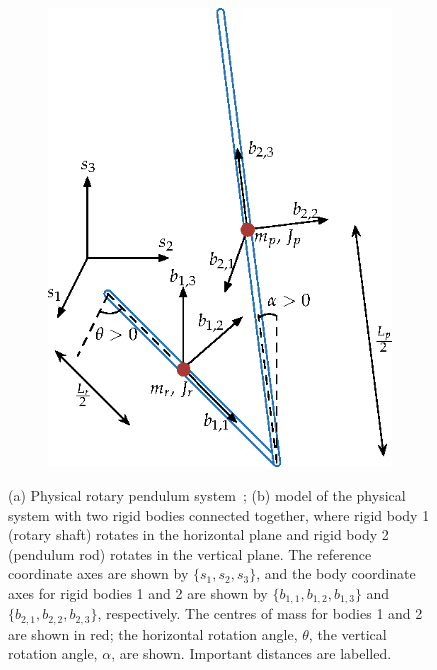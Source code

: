 \begin{figure}[H]
\begin{subfigure}{.4\textwidth}
        \caption{}
    \end{subfigure}\hfill
    \begin{subfigure}{.4\textwidth}
        \includegraphics[width=\textwidth]{eps/lab_2/rotary_pendulum_edit.eps}
        \caption{}
    \end{subfigure}
    \caption{(a) Physical rotary pendulum system~\cite{Q-Flex-Beam}; (b) model of the physical system with two rigid bodies connected together, where rigid body 1 (rotary shaft) rotates in the horizontal plane and rigid body 2 (pendulum rod) rotates in the vertical plane. The reference coordinate axes are shown by $\{s_1,s_2,s_3\}$, and the body coordinate axes for rigid bodies 1 and 2 are shown by $\{b_{1,1},b_{1,2}, b_{1,3}\}$ and $\{b_{2,1},b_{2,2},b_{2,3}\}$, respectively. The centres of mass for bodies 1 and 2 are shown in red; the horizontal rotation angle, $\theta$, the vertical rotation angle, $\alpha$, are shown. Important distances are labelled.}
    \label{fig:lab2_rotary_pendulum}
\end{figure}

